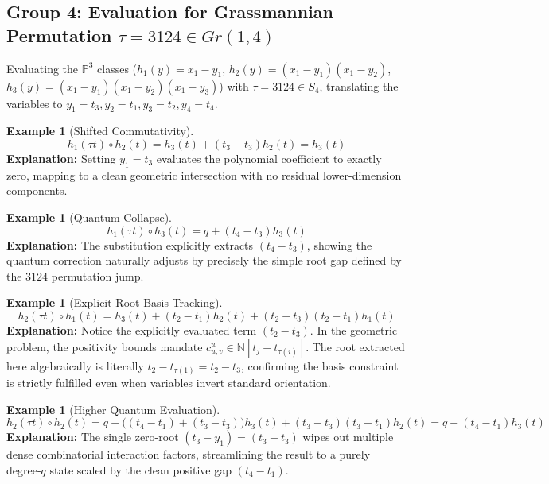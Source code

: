 \documentclass{amsart}
\theoremstyle{definition}
\newtheorem{example}[theorem]{Example}
\begin{document}
\subsection*{Group 4: Evaluation for Grassmannian Permutation $\tau = 3124 \in Gr(1,4)$}
Evaluating the $\mathbb{P}^3$ classes ($h_1(y) = x_1 - y_1$, $h_2(y) = (x_1 - y_1)(x_1 - y_2)$, $h_3(y) = (x_1 - y_1)(x_1 - y_2)(x_1 - y_3)$) with $\tau = 3124 \in S_4$, translating the variables to $y_1 = t_3, y_2 = t_1, y_3 = t_2, y_4 = t_4$.
\begin{example}[Shifted Commutativity]
$$ h_1(\tau t) \circ h_2(t) = h_3(t) + (t_3 - t_3) h_2(t) = h_3(t) $$
\textbf{Explanation:} Setting $y_1 = t_3$ evaluates the polynomial coefficient to exactly zero, mapping to a clean geometric intersection with no residual lower-dimension components.
\end{example}

\begin{example}[Quantum Collapse]
$$ h_1(\tau t) \circ h_3(t) = q + (t_4 - t_3) h_3(t) $$
\textbf{Explanation:} The substitution explicitly extracts $(t_4 - t_3)$, showing the quantum correction naturally adjusts by precisely the simple root gap defined by the $3124$ permutation jump.
\end{example}

\begin{example}[Explicit Root Basis Tracking]
$$ h_2(\tau t) \circ h_1(t) = h_3(t) + (t_2 - t_1) h_2(t) + (t_2 - t_3)(t_2 - t_1) h_1(t) $$
\textbf{Explanation:} Notice the explicitly evaluated term $(t_2 - t_3)$. In the geometric problem, the positivity bounds mandate $c_{u,v}^w \in \mathbb{N}[t_j - t_{\tau(i)}]$. The root extracted here algebraically is literally $t_2 - t_{\tau(1)} = t_2 - t_3$, confirming the basis constraint is strictly fulfilled even when variables invert standard orientation.
\end{example}

\begin{example}[Higher Quantum Evaluation]
$$ h_2(\tau t) \circ h_2(t) = q + \big((t_4 - t_1) + (t_3 - t_3)\big) h_3(t) + (t_3 - t_3)(t_3 - t_1) h_2(t) = q + (t_4 - t_1) h_3(t) $$
\textbf{Explanation:} The single zero-root $(t_3 - y_1) = (t_3 - t_3)$ wipes out multiple dense combinatorial interaction factors, streamlining the result to a purely degree-$q$ state scaled by the clean positive gap $(t_4 - t_1)$.
\end{example}
\end{document}
